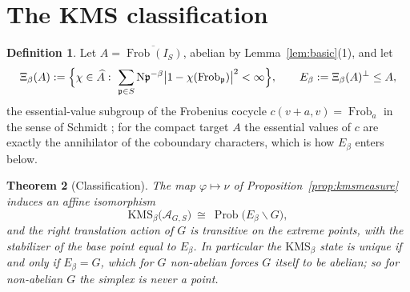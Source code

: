 \documentclass[11pt]{amsart}
\numberwithin{equation}{section}
\newtheorem{theorem}{Theorem}[section]
\theoremstyle{definition}
\newtheorem{definition}[theorem]{Definition}
\theoremstyle{remark}
\newcommand{\cA}{\mathcal{A}}
\newcommand{\pp}{\mathfrak{p}}
\newcommand{\Ns}{\mathrm{N}}
\newcommand{\Frob}{\operatorname{Frob}}
\newcommand{\Prob}{\operatorname{Prob}}
\begin{document}
\section{The KMS classification}

\begin{definition}\label{def:E}
Let $A=\overline{\Frob(I_S)}$, abelian by Lemma~\ref{lem:basic}(1), and let
\[
\Xi_\beta(A):=\Bigl\{\chi\in\widehat A:\ \sum_{\pp\in S}\Ns\pp^{-\beta}\bigl|1-\chi(\Frob_\pp)\bigr|^2<\infty\Bigr\},
\qquad
E_\beta:=\Xi_\beta(A)^\perp\le A ,
\]
the essential-value subgroup of the Frobenius cocycle $c(v+a,v)=\Frob_a$ in the sense of
Schmidt \cite{Schmidt}; for the compact target $A$ the essential values of $c$ are exactly
the annihilator of the coboundary characters, which is how $E_\beta$ enters below.
\end{definition}

\begin{theorem}[Classification]\label{thm:main}
The map $\varphi\mapsto\nu$ of Proposition~\ref{prop:kmsmeasure} induces an affine
isomorphism
\begin{equation}\label{eq:main}
\mathrm{KMS}_\beta\bigl(\cA_{G,S}\bigr)\ \cong\ \Prob\bigl(E_\beta\backslash G\bigr),
\end{equation}
and the right translation action of $G$ is transitive on the extreme points, with the
stabilizer of the base point equal to $E_\beta$. In particular the $\mathrm{KMS}_\beta$
state is unique if and only if $E_\beta=G$, which for $G$ non-abelian forces $G$ itself to be
abelian; so for non-abelian $G$ the simplex is never a point.
\end{theorem}
\end{document}
